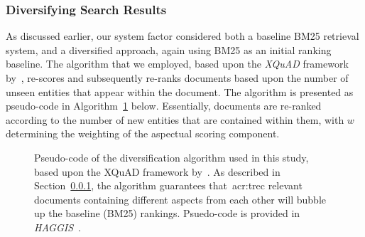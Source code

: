 \subsubsection{Diversifying Search Results}\label{sec:diversity:users:diversifying}
As discussed earlier, our system factor considered both a baseline BM25 retrieval system, and a diversified approach, again using BM25 as an initial ranking baseline. The algorithm that we employed, based upon the \emph{XQuAD} framework by~\cite{santos2010query_reformulations_diversification}, re-scores and subsequently re-ranks documents based upon the number of unseen entities that appear within the document. The algorithm is presented as pseudo-code in Algorithm~\ref{alg:diversifying} below. Essentially, documents are re-ranked according to the number of new entities that are contained within them, with $w$ determining the weighting of the aspectual scoring component.

\renewcommand{\figurename}{Figure/Algorithm}
\begin{figure}[p!]
    \centering
    \caption[Diversification algorithm pseudo-code]{Pseudo-code of the diversification algorithm used in this study, based upon the XQuAD framework by~\cite{santos2010query_reformulations_diversification}. As described in Section~\ref{sec:diversity:users:diversifying}, the algorithm guarantees that~\gls{acr:trec} relevant documents containing different aspects from each other will bubble up the baseline (BM25) rankings. Psuedo-code is provided in \emph{HAGGIS}~\citep{cutts2014haggis}.}
    \label{alg:diversifying}
\end{figure}
\renewcommand{\figurename}{Figure}

